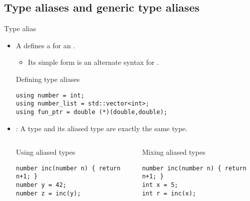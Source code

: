 \subsection{Type aliases and generic type aliases}

\begin{frame}[t,fragile]{Type alias}
\begin{itemize}
  \item A  defines a  for
        an .
    \begin{itemize}
      \item Its simple form is an alternate syntax for .
    \end{itemize}

\begin{block}{Defining type aliases}
\begin{lstlisting}
using number = int;
using number_list = std::vector<int>;
using fun_ptr = double (*)(double,double);
\end{lstlisting}
\end{block}

  \item {}: A type and its aliased type are exactly the same type.

\begin{columns}[T]

\begin{block}{Using aliased types}
\begin{lstlisting}
number inc(number n) { return n+1; }
number y = 42; 
number z = inc(y);
\end{lstlisting}
\end{block}

\pause
{}
\begin{block}{Mixing aliased types}
\begin{lstlisting}
number inc(number n) { return n+1; }
int x = 5; 
int r = inc(x); 
\end{lstlisting}
\end{block}
\end{columns}

\end{itemize}
\end{frame}



